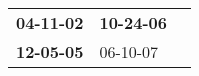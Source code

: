 \begin{supertabular}{p{0.33\columnwidth}p{0.33\columnwidth}p{0.33\columnwidth}}
 \textbf{04-11-02\textsuperscript{}} &  \textbf{10-24-06\textsuperscript{}} \\
 \textbf{12-05-05\textsuperscript{}} &           06-10-07\textsuperscript{} \\
\end{supertabular}

